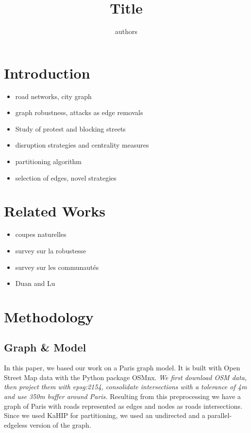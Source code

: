 \documentclass{article}
\title{Title}
\author{authors}
\begin{document}
\maketitle

\section{Introduction}
\begin{itemize}
    \item road networks, city graph
    \item graph robustness, attacks as edge removals
    \item Study of protest and blocking streets
    \item disruption strategies and centrality measures
    \item partitioning algorithm
    \item selection of edges, novel strategies
\end{itemize}

\section{Related Works}
\begin{itemize}
    \item coupes naturelles
    \item survey sur la robustesse %
    \item survey sur les communautés
    \item Duan and Lu
\end{itemize}

\section{Methodology}
\subsection{Graph \& Model}
In this paper, we based our work on a Paris graph model. It is built with Open Street Map data with the Python package OSMnx. \textit{We first download OSM data, then project them with epsg:2154, consolidate intersections with a tolerance of 4m and use  350m buffer around Paris.} Resulting from this preprocessing we have a graph of Paris with roads represented as edges and nodes as roads intersections.\\
Since we used KaHIP for partitioning, we used an undirected and a parallel-edgeless version of the graph.
\end{document}
